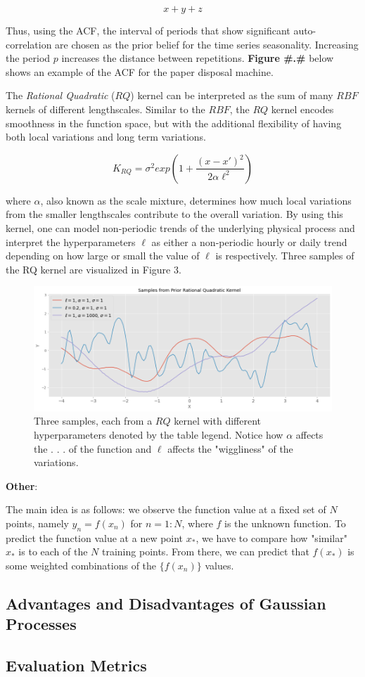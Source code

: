 $$x + y + z$$

Thus, using the ACF, the interval of periods that show significant auto-correlation are chosen as the prior belief for the time series seasonality. Increasing the period $p$ increases the distance between repetitions. \textbf{Figure #.#} below shows an example of the ACF for the paper disposal machine.

The \textit{Rational Quadratic} ($RQ$) kernel can be interpreted as the sum of many $RBF$ kernels of different lengthscales. Similar to the $RBF$, the $RQ$ kernel encodes smoothness in the function space, but with the additional flexibility of having both local variations and long term variations. 

$$K_{RQ} = \sigma^2 exp(1 + \frac{(x - x')^2}{2\alpha \ell^2})$$

where $\alpha$, also known as the scale mixture, determines how much local variations from the smaller lengthscales contribute to the overall variation. By using this kernel, one can model non-periodic trends of the underlying physical process and interpret the hyperparameters $\ell$ as either a non-periodic hourly or daily trend depending on how large or small the value of $\ell$ is respectively. Three samples of the RQ kernel are visualized in Figure 3.

\begin{figure}[htp]
\centering
\graphicspath{ {./images/} }
\includegraphics[scale=0.49]{images/samples_rq_prior.png}
\caption{Three samples, each from a $RQ$ kernel with different hyperparameters denoted by the table legend. Notice how $\alpha$ affects the . . . of the function and $\ell$ affects the "wiggliness" of the variations.}
\end{figure}




\textbf{Other}:

The main idea is as follows: we observe the function value at a fixed set of $N$ points, namely $y_n = f(x_n)$ for $n=1:N$, where $f$ is the unknown function. To predict the function value at a new point $x_*$, we have to compare how "similar" $x_*$ is to each of the $N$ training points. From there, we can predict that $f(x_*)$ is some weighted combinations of the $\{f(x_n)\}$ values.


\subsection{Advantages and Disadvantages of Gaussian Processes}

\subsection{Evaluation Metrics}
